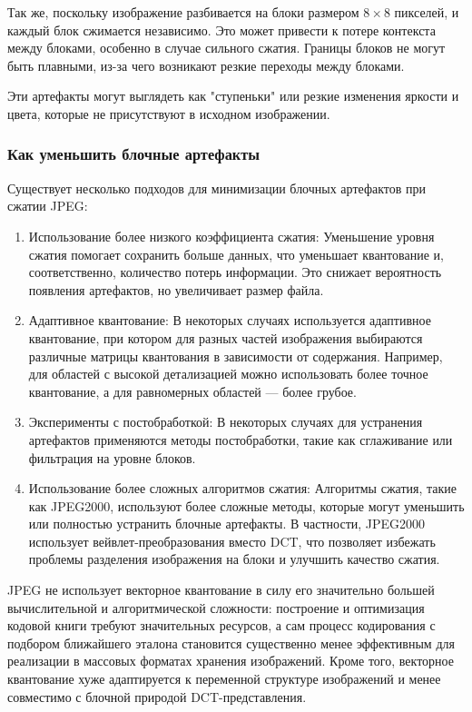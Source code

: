 Так же, поскольку изображение разбивается на блоки размером $8 \times 8$ пикселей, и каждый блок сжимается независимо. 
Это может привести к потере контекста между блоками, особенно в случае сильного сжатия. 
Границы блоков не могут быть плавными, из-за чего возникают резкие переходы между блоками.

Эти артефакты могут выглядеть как "ступеньки" или резкие изменения яркости и цвета, которые не присутствуют в исходном изображении.

\subsubsection{Как уменьшить блочные артефакты}

Существует несколько подходов для минимизации блочных артефактов при сжатии JPEG:
\begin{enumerate}
    \item Использование более низкого коэффициента сжатия: Уменьшение уровня сжатия помогает сохранить больше данных, 
    что уменьшает квантование и, соответственно, количество потерь информации. 
    Это снижает вероятность появления артефактов, но увеличивает размер файла.

    \item Адаптивное квантование: В некоторых случаях используется адаптивное квантование, 
    при котором для разных частей изображения выбираются различные матрицы квантования в зависимости от содержания. 
    Например, для областей с высокой детализацией можно использовать более точное квантование, а для равномерных областей — более грубое.

    \item Эксперименты с постобработкой: В некоторых случаях для устранения артефактов применяются методы постобработки, такие как сглаживание или фильтрация на уровне блоков.

    \item Использование более сложных алгоритмов сжатия: Алгоритмы сжатия, такие как JPEG2000, 
    используют более сложные методы, которые могут уменьшить или полностью устранить блочные артефакты. 
    В частности, JPEG2000 использует вейвлет-преобразования вместо DCT, что позволяет избежать проблемы разделения изображения на блоки и улучшить качество сжатия.
\end{enumerate}

\vspace{1em}

JPEG не использует векторное квантование в силу его значительно большей вычислительной и алгоритмической сложности: 
построение и оптимизация кодовой книги требуют значительных ресурсов, 
а сам процесс кодирования с подбором ближайшего эталона становится существенно менее эффективным для реализации в массовых форматах хранения изображений. 
Кроме того, векторное квантование хуже адаптируется к переменной структуре изображений и менее совместимо с блочной природой DCT-представления.




